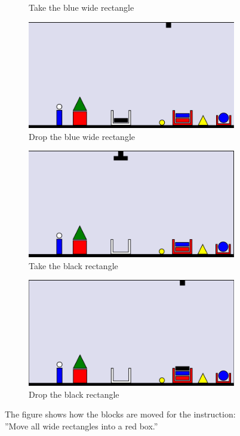 \begin{figure}
\begin{subfigure}{.5\textwidth}
  \caption{Take the blue wide rectangle}
  \label{fig:8}
\end{subfigure}
\begin{subfigure}{.5\textwidth}
  \centering
  \includegraphics[width=.7\linewidth]{fig/9.png}
  \caption{Drop the blue wide rectangle}
  \label{fig:9}
\end{subfigure}%
\begin{subfigure}{.5\textwidth}
  \centering
  \includegraphics[width=.7\linewidth]{fig/10.png}
  \caption{Take the black rectangle}
  \label{fig:10}
\end{subfigure}
\begin{subfigure}{.5\textwidth}
  \centering
  \includegraphics[width=.7\linewidth]{fig/11.png}
  \caption{Drop the black rectangle}
  \label{fig:11}
\end{subfigure}
\caption{The figure shows how the blocks are moved for the instruction: ''Move all wide rectangles into a red 
box.''}
\label{fig:moveex}
\end{figure}

